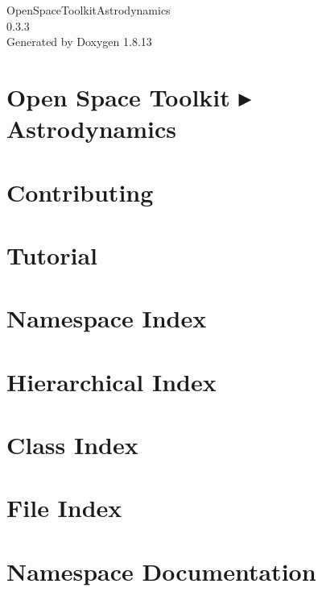 \documentclass[twoside]{book}
\newcommand{\+}{\discretionary{\mbox{\scriptsize$\hookleftarrow$}}{}{}}
\newcommand{\clearemptydoublepage}{%
  \newpage{\pagestyle{empty}\cleardoublepage}%
}
\begin{document}
\hypersetup{pageanchor=false,
             bookmarksnumbered=true,
             pdfencoding=unicode
            }
\begin{titlepage}
\vspace*{7cm}
\begin{center}%
{\Large Open\+Space\+Toolkit\+Astrodynamics \\[1ex]\large 0.\+3.\+3 }\\
\vspace*{1cm}
{\large Generated by Doxygen 1.8.13}\\
\end{center}
\end{titlepage}
\clearemptydoublepage
{}
\tableofcontents
\clearemptydoublepage
{}
\hypersetup{pageanchor=true}

\chapter{Open Space Toolkit ▸ Astrodynamics}
\label{index}\hypertarget{index}{}
\chapter{Contributing}
\label{md__c_o_n_t_r_i_b_u_t_i_n_g}

\chapter{Tutorial}
\label{md_docs__tutorial}

\chapter{Namespace Index}

\chapter{Hierarchical Index}

\chapter{Class Index}

\chapter{File Index}

\chapter{Namespace Documentation}











\end{document}
